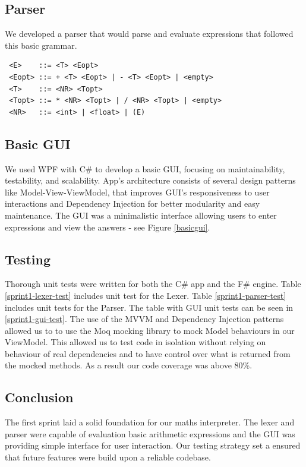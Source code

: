 \documentclass[a4paper, oneside, 11pt]{report}
\begin{document}
\subsection{Parser}
We developed a parser that would parse and evaluate expressions that followed this basic grammar.
\begin{verbatim}
 <E>    ::= <T> <Eopt>
 <Eopt> ::= + <T> <Eopt> | - <T> <Eopt> | <empty>
 <T>    ::= <NR> <Topt>
 <Topt> ::= * <NR> <Topt> | / <NR> <Topt> | <empty>
 <NR>   ::= <int> | <float> | (E)
\end{verbatim}

\subsection{Basic GUI}
We used WPF\cite{WPF:2023} with C\# to develop a basic GUI, focusing on maintainability, testability, and scalability. App's architecture consists of several design patterns like Model-View-ViewModel\cite{MVVM:2022}, that improves GUI's responsiveness to user interactions and Dependency Injection\cite{DI:2023} for better modularity and easy maintenance. The GUI was a minimalistic interface allowing users to enter expressions and view the answers - see Figure \ref{basicgui}.

\subsection{Testing}
Thorough unit tests were written for both the C\# app and the F\# engine. Table \ref{sprint1-lexer-test} includes unit test for the Lexer. Table \ref{sprint1-parser-test} includes unit tests for the Parser. The table with GUI unit tests can be seen in \ref{sprint1-gui-test}. The use of the MVVM and Dependency Injection patterns allowed us to to use the Moq\cite{Moq} mocking library to mock Model behaviours in our ViewModel. This allowed us to test code in isolation without relying on behaviour of real dependencies and to have control over what is returned from the mocked methods. As a result our code coverage was above 80\%.

\subsection{Conclusion}
The first sprint laid a solid foundation for our maths interpreter. The lexer and parser were capable of evaluation basic arithmetic expressions and the GUI was providing simple interface for user interaction. Our testing strategy set a ensured that future features were build upon a reliable codebase. 
\end{document}
